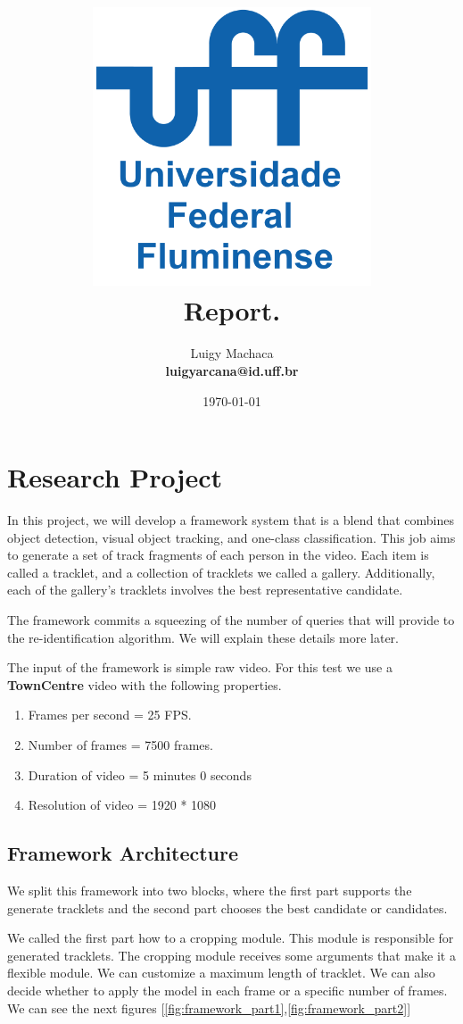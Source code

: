 \documentclass[a4paper]{article}
\title{
    \vspace*{1in}
    \includegraphics[width=3.25in]{figures/uff-logo.png} \\
    \vspace*{1.2in}
    \textbf{\huge Report.}
    \vspace{0.2in}\\
    \vspace{0.2in}
}
\author{Luigy Machaca \\
    \textbf{luigyarcana@id.uff.br} \\
}
\date{\today}
\begin{document}
\maketitle
\setcounter{page}{0}
\thispagestyle{empty}
\newpage


\section{Research Project}
In this project, we will develop a framework system that is a blend that combines object detection, visual object tracking, and one-class classification. This job aims to generate a set of track fragments of each person in the video. Each item is called a tracklet, and a collection of tracklets we called a gallery. Additionally, each of the gallery's tracklets involves the best representative candidate.

The framework commits a squeezing of the number of queries that will provide to the re-identification algorithm. We will explain these details more later.

The input of the framework is simple raw video. For this test we use a \textbf{TownCentre} video with the following properties.

\begin{enumerate}
    \item Frames per second = 25 FPS.
    \item Number of frames = 7500 frames.
    
    \item Duration of video = 5 minutes 0 seconds
    \item Resolution of video = 1920 * 1080
\end{enumerate}

\subsection{Framework Architecture}

We split this framework into two blocks, where the first part supports the generate tracklets and the second part chooses the best candidate or candidates. 

We called the first part how to a cropping module. This module is responsible for generated tracklets. The cropping module receives some arguments that make it a flexible module. We can customize a maximum length of tracklet. We can also decide whether to apply the model in each frame or a specific number of frames.  We can see the next figures [\ref{fig:framework_part1},\ref{fig:framework_part2}]
\end{document}
